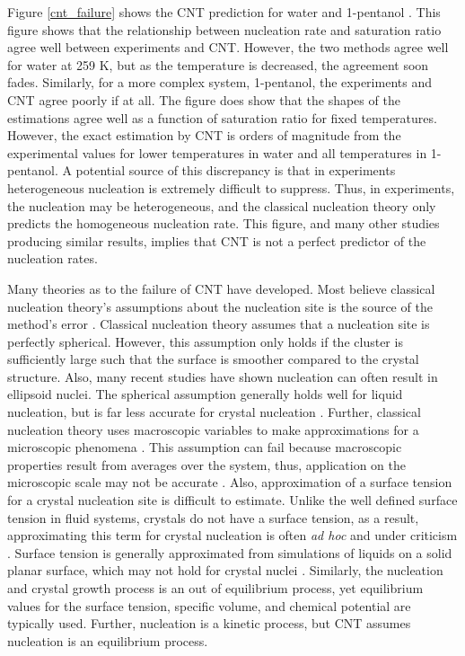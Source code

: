 Figure \ref{cnt_failure} shows the CNT prediction for water and 1-pentanol \cite{Vehkamaki2006}.  This figure shows that the relationship between nucleation rate and saturation ratio agree well between experiments and CNT.  However, the two methods agree well for water at 259 K, but as the temperature is decreased, the agreement soon fades.  Similarly, for a more complex system, 1-pentanol, the experiments and CNT agree poorly if at all.  The figure does show that the shapes of the estimations agree well as a function of saturation ratio for fixed temperatures.  However, the exact estimation by CNT is orders of magnitude from the experimental values for lower temperatures in water and all temperatures in 1-pentanol.  A potential source of this discrepancy is that in experiments heterogeneous nucleation is extremely difficult to suppress.  Thus, in experiments, the nucleation may be heterogeneous, and the classical nucleation theory only predicts the homogeneous nucleation rate. This figure, and many other studies producing similar results, implies that CNT is not a perfect predictor of the nucleation rates.

Many theories as to the failure of CNT have developed.  Most believe classical nucleation theory's assumptions about the nucleation site is the source of the method's error \cite{Reguera2013}.  Classical nucleation theory assumes that a nucleation site is perfectly spherical.  However, this assumption only holds if the cluster is sufficiently large such that the surface is smoother compared to the crystal structure.  Also, many recent studies have shown nucleation can often result in ellipsoid nuclei.  The spherical assumption generally holds well for liquid nucleation, but is far less accurate for crystal nucleation \cite{Oxtoby1992}.  Further, classical nucleation theory uses macroscopic variables to make approximations for a microscopic phenomena \cite{Reguera2013}.  This assumption can fail because macroscopic properties result from averages over the system, thus, application on the microscopic scale may not be accurate \cite{Oxtoby1992}.  Also, approximation of a surface tension for a crystal nucleation site is difficult to estimate.  Unlike the well defined surface tension in fluid systems, crystals do not have a surface tension, as a result, approximating this term for crystal nucleation is often \textit{ad hoc} and under criticism \cite{mutaftschiev2001atomistic}.  Surface tension is generally approximated from simulations of liquids on a solid planar surface, which may not hold for crystal nuclei \cite{mutaftschiev2001atomistic}.  Similarly, the nucleation and crystal growth process is an out of equilibrium process, yet equilibrium values for the surface tension, specific volume, and chemical potential are typically used.  Further, nucleation is a kinetic process, but CNT assumes nucleation is an equilibrium process.


